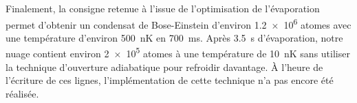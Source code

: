 Finalement, la consigne retenue à l'issue de l'optimisation de l'évaporation permet d'obtenir un condensat de Bose-Einstein d'environ \SI{1.2e6}{} atomes avec une température d'environ \SI{500}{\nano\kelvin} en \SI{700}{\milli\second}. Après \SI{3.5}{\second} d'évaporation, notre nuage contient environ \SI{2e5}{} atomes à une température de \SI{10}{\nano\kelvin} sans utiliser la technique d'ouverture adiabatique pour refroidir davantage. À l'heure de l'écriture de ces lignes, l'implémentation de cette technique n'a pas encore été réalisée.




